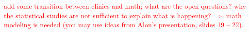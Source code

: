 \begin{frame}

\textcolor{red}{add some transition between clinics and math; what are the open questions?
why the statistical studies are not sufficient to explain what is happening? $\Rightarrow$ math modeling
is needed (you may use ideas from Alon's presentation, slides 19 -- 22).}
\end{frame}

%
%
%
%
%
